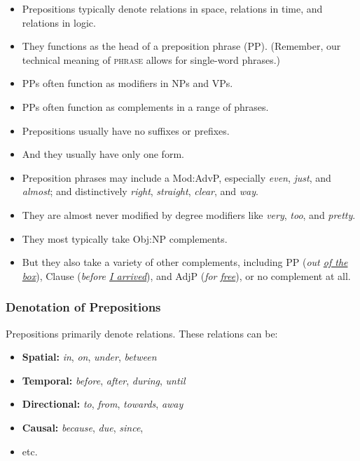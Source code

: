 \begin{itemize}
   \item Prepositions typically denote relations in space, relations in time, and relations in logic.
   \item They functions as the head of a preposition phrase (PP). (Remember, our technical meaning of \textsc{phrase} allows for single-word phrases.)
   \item PPs often function as modifiers in NPs and VPs.
   \item PPs often function as complements in a range of phrases.
   \item Prepositions usually have no suffixes or prefixes.
   \item And they usually have only one form.
   \item Preposition phrases may include a Mod:AdvP, especially \textit{even}, \textit{just}, and \textit{almost}; and distinctively \textit{right}, \textit{straight}, \textit{clear}, and \textit{way}.
   \item They are almost never modified by degree modifiers like \textit{very}, \textit{too}, and \textit{pretty}.
   \item They most typically take Obj:NP complements.
   \item But they also take a variety of other complements, including PP (\textit{out \uline{of the box}}), Clause (\textit{before \uline{I arrived}}), and AdjP (\textit{for \uline{free}}), or no complement at all.
\end{itemize}

\subsubsection*{Denotation of Prepositions}

Prepositions primarily denote relations. These relations can be:

\begin{itemize}
   \item \textbf{Spatial:} \textit{in}, \textit{on}, \textit{under}, \textit{between}
   \item \textbf{Temporal:} \textit{before}, \textit{after}, \textit{during}, \textit{until}
   \item \textbf{Directional:} \textit{to}, \textit{from}, \textit{towards}, \textit{away}
   \item \textbf{Causal:} \textit{because}, \textit{due}, \textit{since},
   \item etc.
\end{itemize}

